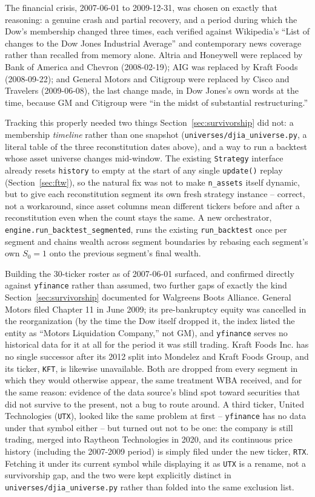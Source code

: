 \documentclass[11pt]{article}
\begin{document}
The financial crisis, 2007-06-01 to 2009-12-31, was chosen on exactly
that reasoning: a genuine crash and partial recovery, and a period
during which the Dow's membership changed three times, each verified
against Wikipedia's ``List of changes to the Dow Jones Industrial
Average'' and contemporary news coverage rather than recalled from
memory alone. Altria and Honeywell were replaced by Bank of America and
Chevron (2008-02-19); AIG was replaced by Kraft Foods (2008-09-22); and
General Motors and Citigroup were replaced by Cisco and Travelers
(2009-06-08), the last change made, in Dow Jones's own words at the
time, because GM and Citigroup were ``in the midst of substantial
restructuring.''

Tracking this properly needed two things Section~\ref{sec:survivorship}
did not: a membership \emph{timeline} rather than one snapshot
(\texttt{universes/djia\_universe.py}, a literal table of the three reconstitution
dates above), and a way to run a backtest whose asset universe changes
mid-window. The existing \texttt{Strategy} interface already resets
\texttt{history} to empty at the start of any single \texttt{update()}
replay (Section~\ref{sec:ftw}), so the natural fix was not to make
\texttt{n\_assets} itself dynamic, but to give each reconstitution
segment its own fresh strategy instance -- correct, not a workaround,
since asset columns mean different tickers before and after a
reconstitution even when the count stays the same. A new orchestrator,
\texttt{engine.run\_backtest\_segmented}, runs the existing
\texttt{run\_backtest} once per segment and chains wealth across
segment boundaries by rebasing each segment's own $S_0 = 1$ onto the
previous segment's final wealth.

Building the 30-ticker roster as of 2007-06-01 surfaced, and confirmed
directly against \texttt{yfinance} rather than assumed, two further
gaps of exactly the kind Section~\ref{sec:survivorship} documented for
Walgreens Boots Alliance. General Motors filed Chapter 11 in June 2009;
its pre-bankruptcy equity was cancelled in the reorganization (by the
time the Dow itself dropped it, the index listed the entity as
``Motors Liquidation Company,'' not GM), and \texttt{yfinance} serves no
historical data for it at all for the period it was still trading.
Kraft Foods Inc. has no single successor after its 2012 split into
Mondelez and Kraft Foods Group, and its ticker, \texttt{KFT}, is
likewise unavailable. Both are dropped from every segment in which they
would otherwise appear, the same treatment WBA received, and for the
same reason: evidence of the data source's blind spot toward securities
that did not survive to the present, not a bug to route around. A third
ticker, United Technologies (\texttt{UTX}), looked like the same
problem at first -- \texttt{yfinance} has no data under that symbol
either -- but turned out not to be one: the company is still trading,
merged into Raytheon Technologies in 2020, and its continuous price
history (including the 2007-2009 period) is simply filed under the new
ticker, \texttt{RTX}. Fetching it under its current symbol while
displaying it as \texttt{UTX} is a rename, not a survivorship gap, and
the two were kept explicitly distinct in \texttt{universes/djia\_universe.py}
rather than folded into the same exclusion list.
\end{document}
